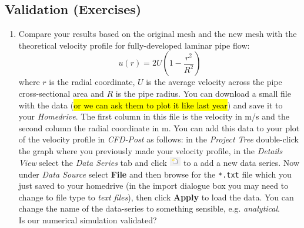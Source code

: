 \documentclass[11pt,a4paper,oneside,hidelinks]{scrartcl}
\newcommand\bfr[1]{\textcolor[rgb]{1,0.00,0.00}{\textbf{\textsf{#1}}}}
\begin{document}
\subsection{Validation (Exercises)}

\begin{enumerate}
\item Compare your results based on the original mesh and the new mesh with the theoretical velocity profile for fully-developed laminar pipe flow:
\begin{equation}
    u(r)=2U\left(1-\frac{r^2}{R^2}\right)
\end{equation}
where $r$ is the radial coordinate, $U$ is the average velocity across the pipe cross-sectional area and $R$ is the pipe radius. You can download a small file with the data  (\hl{or we can ask them to plot it like last year}) and save it to your \emph{Homedrive}. The first column in this file is the velocity in m/s and the second column the radial coordinate in m. You can add this data to your plot of the velocity profile in \emph{CFD-Post} as follows: in the \emph{Project Tree} double-click the graph where you previously made your velocity profile, in the \emph{Details View} select the \emph{Data Series} tab and click \includegraphics[width=0.5cm,clip]{new_symbol.png} to a add a new data series. Now under \emph{Data Source} select \bfr{File} and then browse for the \texttt{*.txt} file which you just saved to your homedrive (in the import dialogue box you may need to change to file type to \emph{text files}), then click \bfr{Apply} to load the data. You can change the name of the data-series to something sensible, e.g. \emph{analytical}. \\
Is our numerical simulation validated?


\end{enumerate}
\end{document}
